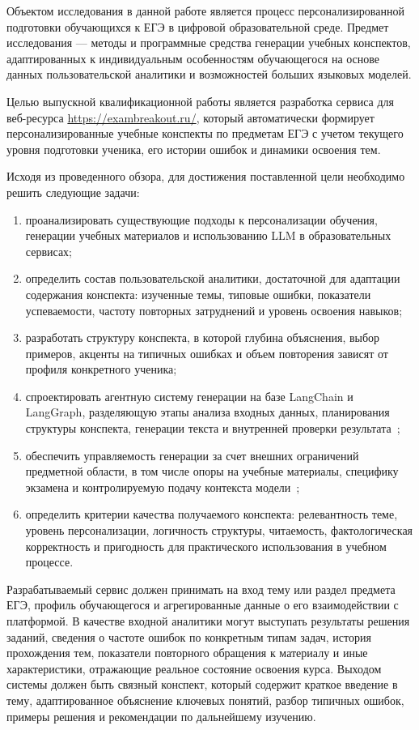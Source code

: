 \documentclass[a4paper,12pt]{extarticle}
\begin{document}
Объектом исследования в данной работе является процесс персонализированной подготовки обучающихся к ЕГЭ в цифровой образовательной среде. Предмет исследования --- методы и программные средства генерации учебных конспектов, адаптированных к индивидуальным особенностям обучающегося на основе данных пользовательской аналитики и возможностей больших языковых моделей.

Целью выпускной квалификационной работы является разработка сервиса для веб-ресурса \url{https://exambreakout.ru/}, который автоматически формирует персонализированные учебные конспекты по предметам ЕГЭ с учетом текущего уровня подготовки ученика, его истории ошибок и динамики освоения тем.

Исходя из проведенного обзора, для достижения поставленной цели необходимо решить следующие задачи:

\begin{enumerate}
    \item проанализировать существующие подходы к персонализации обучения, генерации учебных материалов и использованию LLM в образовательных сервисах;
    \item определить состав пользовательской аналитики, достаточной для адаптации содержания конспекта: изученные темы, типовые ошибки, показатели успеваемости, частоту повторных затруднений и уровень освоения навыков;
    \item разработать структуру конспекта, в которой глубина объяснения, выбор примеров, акценты на типичных ошибках и объем повторения зависят от профиля конкретного ученика;
    \item спроектировать агентную систему генерации на базе LangChain и LangGraph, разделяющую этапы анализа входных данных, планирования структуры конспекта, генерации текста и внутренней проверки результата~\cite{langchain2024};
    \item обеспечить управляемость генерации за счет внешних ограничений предметной области, в том числе опоры на учебные материалы, специфику экзамена и контролируемую подачу контекста модели~\cite{lewis2020rag,ding2025ragedu};
    \item определить критерии качества получаемого конспекта: релевантность теме, уровень персонализации, логичность структуры, читаемость, фактологическая корректность и пригодность для практического использования в учебном процессе.
\end{enumerate}

Разрабатываемый сервис должен принимать на вход тему или раздел предмета ЕГЭ, профиль обучающегося и агрегированные данные о его взаимодействии с платформой. В качестве входной аналитики могут выступать результаты решения заданий, сведения о частоте ошибок по конкретным типам задач, история прохождения тем, показатели повторного обращения к материалу и иные характеристики, отражающие реальное состояние освоения курса. Выходом системы должен быть связный конспект, который содержит краткое введение в тему, адаптированное объяснение ключевых понятий, разбор типичных ошибок, примеры решения и рекомендации по дальнейшему изучению.
\end{document}
